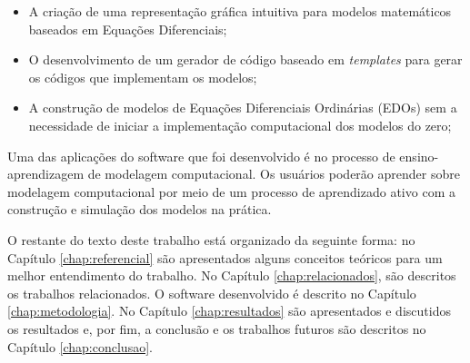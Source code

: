 \documentclass[
	12pt,				%
	openright,			%
	oneside,			%
	a4paper,			%
	main=brazil,
	english,			%
	]{ufsj-abntex2}
\begin{document}
\begin{itemize}
    \item A criação de uma representação gráfica intuitiva para modelos matemáticos baseados em Equações Diferenciais; 
    \item O desenvolvimento de um gerador de código baseado em \textit{templates} para gerar os códigos que implementam os modelos; 
    \item A construção de modelos de Equações Diferenciais Ordinárias (EDOs) sem a necessidade de iniciar a implementação computacional dos modelos do zero; 
\end{itemize}

Uma das aplicações do software que foi desenvolvido é no processo de ensino-aprendizagem de modelagem computacional. Os usuários poderão aprender sobre modelagem computacional por meio de um processo de aprendizado ativo com a construção e simulação dos modelos na prática. 

O restante do texto deste trabalho está organizado da seguinte forma: no Capítulo \ref{chap:referencial} são apresentados alguns conceitos teóricos para um melhor entendimento do trabalho. No Capítulo \ref{chap:relacionados}, são descritos os trabalhos relacionados. O software desenvolvido é descrito no Capítulo \ref{chap:metodologia}. No Capítulo \ref{chap:resultados} são apresentados e discutidos os resultados e, por fim, a conclusão e os trabalhos futuros são descritos no Capítulo \ref{chap:conclusao}. 





\end{document}
